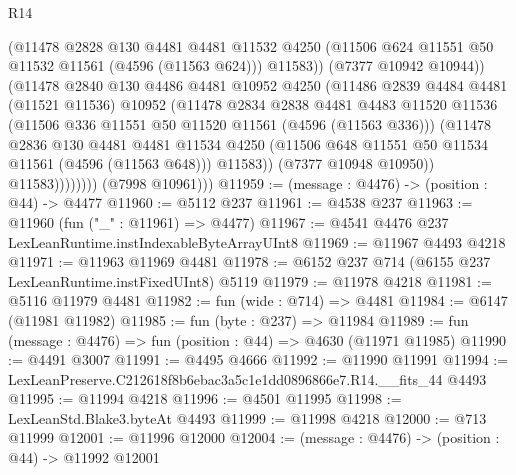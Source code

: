 \begin{lexlean}{R14}
\begin{coremodule}
                          (@11478
                            @2828
                            @130
                            @4481
                            @4481
                            @11532
                            @4250
                            (@11506 @624 @11551 @50 @11532 @11561 (@4596 (@11563 @624)))
                            @11583))
                        (@7377 @10942 @10944))
                      (@11478
                        @2840
                        @130
                        @4486
                        @4481
                        @10952
                        @4250
                        (@11486
                          @2839
                          @4484
                          @4481
                          (@11521 @11536)
                          @10952
                          (@11478
                            @2834
                            @2838
                            @4481
                            @4483
                            @11520
                            @11536
                            (@11506 @336 @11551 @50 @11520 @11561 (@4596 (@11563 @336)))
                            (@11478
                              @2836
                              @130
                              @4481
                              @4481
                              @11534
                              @4250
                              (@11506 @648 @11551 @50 @11534 @11561 (@4596 (@11563 @648)))
                              @11583))
                          (@7377 @10948 @10950))
                        @11583))))))))
        (@7998 @10961)))
@11959 := (message : @4476) -> (position : @44) -> @4477
@11960 := @5112 @237
@11961 := @4538 @237
@11963 := @11960 (fun ("_" : @11961) => @4477)
@11967 := @4541 @4476 @237 LexLeanRuntime.instIndexableByteArrayUInt8
@11969 := @11967 @4493 @4218
@11971 := @11963 @11969 @4481
@11978 := @6152 @237 @714 (@6155 @237 LexLeanRuntime.instFixedUInt8) @5119
@11979 := @11978 @4218
@11981 := @5116 @11979 @4481
@11982 := fun (wide : @714) => @4481
@11984 := @6147 (@11981 @11982)
@11985 := fun (byte : @237) => @11984
@11989 := fun (message : @4476) => fun (position : @44) => @4630 (@11971 @11985)
@11990 := @4491 @3007
@11991 := @4495 @4666
@11992 := @11990 @11991
@11994 := LexLeanPreserve.C212618f8b6ebac3a5c1e1dd0896866e7.R14.__fits_44 @4493
@11995 := @11994 @4218
@11996 := @4501 @11995
@11998 := LexLeanStd.Blake3.byteAt @4493
@11999 := @11998 @4218
@12000 := @713 @11999
@12001 := @11996 @12000
@12004 := (message : @4476) -> (position : @44) -> @11992 @12001

\end{coremodule}
\end{lexlean}
